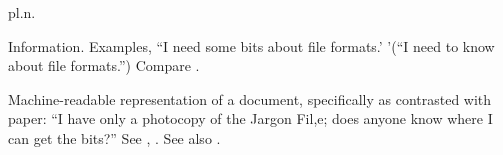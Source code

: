  pl.n.

\begin{inparaenum}
    \item Information. Examples, ``I need some bits about file formats.' '(``I
        need to know about file formats.'') Compare .
    \item Machine-readable representation of a document, specifically as
        contrasted with paper: ``I have only a photocopy of the Jargon Fil,e;
        does anyone know where I can get the bits?'' See ,
        . See also .
\end{inparaenum}

